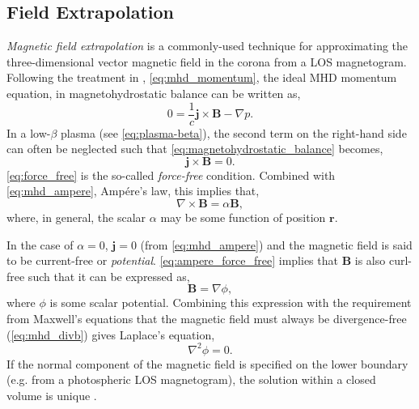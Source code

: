 \subsection{Field Extrapolation}\label{sec:field_extrapolation}

\textit{Magnetic field extrapolation} is a commonly-used technique for approximating the three-dimensional vector magnetic field in the corona from a LOS magnetogram. Following the treatment in \citet[Chapter 3]{priest_magnetohydrodynamics_2014}, \autoref{eq:mhd_momentum}, the ideal MHD momentum equation, in magnetohydrostatic balance can be written as,
\begin{equation}\label{eq:magnetohydrostatic_balance}
    0 = \frac{1}{c}\mathbf{j}\times\mathbf{B} - \nabla p.
\end{equation}
In a low-$\beta$ plasma (see \autoref{eq:plasma-beta}), the second term on the right-hand side can often be neglected such that \autoref{eq:magnetohydrostatic_balance} becomes,
\begin{equation}\label{eq:force_free}
    \mathbf{j}\times\mathbf{B} = 0.
\end{equation}
\autoref{eq:force_free} is the so-called \textit{force-free} condition. Combined with \autoref{eq:mhd_ampere}, Amp\'{e}re's law, this implies that,
\begin{equation}\label{eq:ampere_force_free}
    \nabla\times\mathbf{B} = \alpha\mathbf{B},
\end{equation}
where, in general, the scalar $\alpha$ may be some function of position $\mathbf{r}$.

In the case of $\alpha=0$, $\mathbf{j}=0$ (from \autoref{eq:mhd_ampere}) and the magnetic field is said to be current-free or \textit{potential}. \autoref{eq:ampere_force_free} implies that $\mathbf{B}$ is also curl-free such that it can be expressed as,
\begin{equation}\label{eq:b_potential}
    \mathbf{B}=\nabla\phi,
\end{equation}
 where $\phi$ is some scalar potential. Combining this expression with the requirement from Maxwell's equations that the magnetic field must always be divergence-free (\autoref{eq:mhd_divb}) gives Laplace's equation,
\begin{equation}\label{eq:laplace}
    \nabla^2\phi = 0.
\end{equation}
If the normal component of the magnetic field is specified on the lower boundary (e.g. from a photospheric LOS magnetogram), the solution within a closed volume is unique \citep{priest_magnetohydrodynamics_2014}.

